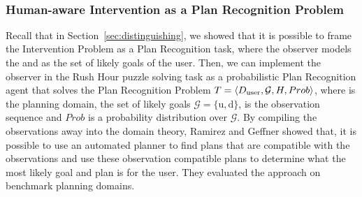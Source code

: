 \begin{table}[tpb]
\caption{Precision, Recall and F-scores for the prediction accuracy of the Human-aware Intervention learned models. Classifiers that reported the highest precision, recall and F-score are in bold. When $k=3$, both the KNN and logistic regression classifiers have the same F-score. However, KNN has the best precision. The best recall value is reported for the logistic regression classifier. Therefore both are highlighted}
%
\label{tab:rupsraccuracy}
\end{table}

~\subsubsection{Human-aware Intervention as a Plan Recognition Problem}
Recall that in Section~\ref{sec:distinguishing}, we showed that it is possible to frame the Intervention Problem as a Plan Recognition task, where the observer models the \undesired and \desired as the set of likely goals of the user.
Then, we can implement the observer in the Rush Hour puzzle solving task as a probabilistic Plan Recognition agent that solves the Plan Recognition Problem $T=\langle D_{\textnormal{user}}, \mathcal{G}, H, Prob \rangle$, where \domainUser is the planning domain, the set of likely goals $\mathcal{G}=\lbrace \mathrm{u},\mathrm{d}\rbrace$, \historyDef is the observation sequence and $Prob$ is a probability distribution over $\mathcal{G}$. 
By compiling the observations away into the domain theory, Ramirez and Geffner showed that, it is possible to use an automated planner to find plans that are compatible with the observations and use these observation compatible plans to determine what the most likely goal and plan \cite{ramirez2010probabilistic} is for the user. 
They evaluated the approach on benchmark planning domains.

